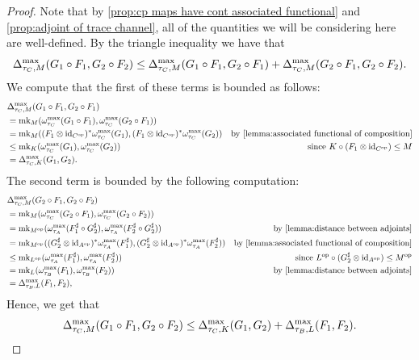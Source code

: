 \documentclass[11pt, a4paper, oneside, final, reqno]{amsart}
\newcommand{\id}{\operatorname{id}}
\newcommand{\mk}{\operatorname{mk}}
\theoremstyle{definition}
\theoremstyle{plain}
\theoremstyle{remark}
\numberwithin{equation}{section}
\begin{document}
\begin{proof}
    Note that by \cref{prop:cp maps have cont associated functional} and \cref{prop:adjoint of trace channel}, all of the quantities we will be considering here are well-defined. By the triangle inequality we have that
    \begin{equation*}
        \Delta_{\tau_C,M}^{\rm max}(G_1 \circ F_1, G_2 \circ F_2)
        \leq \Delta_{\tau_C,M}^{\rm max}(G_1 \circ F_1, G_2 \circ F_1) + \Delta_{\tau_C,M}^{\rm max}(G_2 \circ F_1, G_2 \circ F_2).
    \end{equation*}
    We compute that the first of these terms is bounded as follows:
    \begin{align*}
        & \Delta_{\tau_C,M}^{\rm max}(G_1 \circ F_1, G_2 \circ F_1) & \\
        & = \mk_{M}(\omega_{\tau_C}^{\rm max}(G_1 \circ F_1), \omega_{\tau_C}^{\rm max}(G_2 \circ F_1)) & \\
        & = \mk_{M}((F_1 \otimes \id_{C^{\rm op}})^*\omega_{\tau_C}^{\rm max}(G_1), (F_1 \otimes \id_{C^{\rm op}})^*\omega_{\tau_C}^{\rm max}(G_2)) & \text{by \cref{lemma:associated functional of composition}} \\
        & \leq \mk_{K}(\omega_{\tau_C}^{\rm max}(G_1), \omega_{\tau_C}^{\rm max}(G_2)) & \text{since } K \circ (F_1 \otimes \id_{C^{\rm op}}) \leq M \\
        & = \Delta_{\tau_C,K}^{\rm max}(G_1, G_2). &
    \end{align*}
    The second term is bounded by the following computation:
    \begin{align*}
        & \Delta_{\tau_C,M}^{\rm max}(G_2 \circ F_1, G_2 \circ F_2) & \\
        & = \mk_{M}(\omega_{\tau_C}^{\rm max}(G_2 \circ F_1), \omega_{\tau_C}^{\rm max}(G_2 \circ F_2)) & \\
        & = \mk_{M^{\rm op}}(\omega_{\tau_A}^{\rm max}(F_1^\sharp \circ G_2^\sharp), \omega_{\tau_A}^{\rm max}(F_2^\sharp \circ G_2^\sharp)) & \text{by \cref{lemma:distance between adjoints}} \\
        & = \mk_{M^{\rm op}}((G_2^\sharp \otimes \id_{A^{\rm op}})^*\omega_{\tau_A}^{\rm max}(F_1^\sharp), (G_2^\sharp \otimes \id_{A^{\rm op}})^*\omega_{\tau_A}^{\rm max}(F_2^\sharp)) & \text{by \cref{lemma:associated functional of composition}} \\
        & \leq \mk_{L^{\rm op}}(\omega_{\tau_A}^{\rm max}(F_1^\sharp), \omega_{\tau_A}^{\rm max}(F_2^\sharp)) & \text{since } L^{\rm op} \circ (G_2^\sharp \otimes \id_{A^{\rm op}}) \leq M^{\rm op} \\
        & = \mk_{L}(\omega_{\tau_B}^{\rm max}(F_1), \omega_{\tau_B}^{\rm max}(F_2)) & \text{by \cref{lemma:distance between adjoints}} \\
        & = \Delta_{\tau_B,L}^{\rm max}(F_1, F_2), &
    \end{align*}
    Hence, we get that
    \begin{equation*}
        \Delta_{\tau_C,M}^{\rm max}(G_1 \circ F_1, G_2 \circ F_2)
        \leq \Delta_{\tau_C,K}^{\rm max}(G_1, G_2) + \Delta_{\tau_B,L}^{\rm max}(F_1, F_2). \qedhere
    \end{equation*}
\end{proof}
\end{document}
